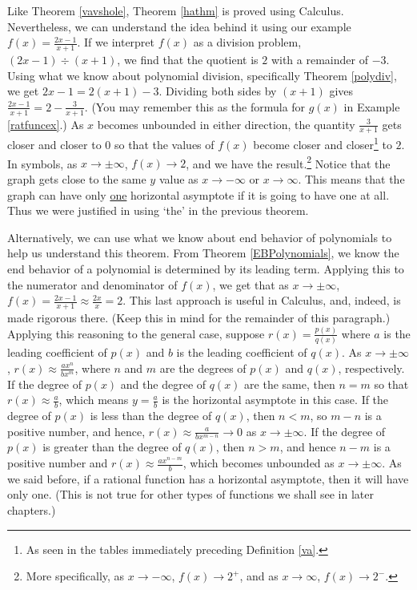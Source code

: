 Like Theorem \ref{vavshole}, Theorem \ref{hathm} is proved using Calculus.  Nevertheless, we can understand the idea behind it using our example $f(x) = \frac{2x-1}{x+1}$.  If we interpret $f(x)$ as a division problem, $(2x-1) \div (x+1)$, we find that the quotient is $2$ with a remainder of $-3$.  Using what we know about polynomial division, specifically Theorem \ref{polydiv}, we get $2x-1 = 2(x+1) -3$.  Dividing both sides by $(x+1)$ gives   $\frac{2x-1}{x+1} = 2 - \frac{3}{x+1}$.  (You may remember this as the formula for $g(x)$ in Example \ref{ratfuncex}.)  As $x$ becomes unbounded in either direction, the quantity $\frac{3}{x+1}$ gets closer and closer to $0$ so that the values of $f(x)$ become closer and closer\footnote{As seen in the tables immediately preceding Definition \ref{va}.} to $2$. In symbols, as $x \rightarrow \pm \infty$, $f(x) \rightarrow 2$, and we have the result.\footnote{More specifically, as $x \rightarrow -\infty$, $f(x) \rightarrow 2^{+}$, and as $x \rightarrow \infty$, $f(x) \rightarrow 2^{-}$.}  Notice that the graph gets close to the same $y$ value as $x \rightarrow -\infty$ or $x \rightarrow \infty$.  This means that the graph can have only \underline{one} horizontal asymptote if it is going to have one at all.  Thus we were justified in using `the' in the previous theorem.

\smallskip

Alternatively, we can use what we know about end behavior of polynomials to help us understand this theorem.  From Theorem \ref{EBPolynomials}, we know the end behavior of a polynomial is determined by its leading term.  Applying this to the numerator and denominator of $f(x)$, we get that as $x \rightarrow \pm \infty$, $f(x) = \frac{2x-1}{x+1} \approx \frac{2x}{x} = 2$.  This last approach is useful in Calculus, and, indeed, is made rigorous there.  (Keep this in mind for the remainder of this paragraph.)  Applying this reasoning to the general case, suppose $r(x) = \frac{p(x)}{q(x)}$ where $a$ is the leading coefficient of $p(x)$ and $b$ is the leading coefficient of $q(x)$. As $x \rightarrow \pm \infty$, $r(x) \approx \frac{ax^n}{bx^m}$, where $n$ and $m$ are the degrees of $p(x)$ and $q(x)$, respectively.  If the degree of $p(x)$ and the degree of $q(x)$ are the same, then $n=m$ so that $r(x) \approx \frac{a}{b}$, which means $y=\frac{a}{b}$ is the horizontal asymptote in this case.  If the degree of $p(x)$ is less than the degree of $q(x)$, then $n < m$, so $m-n$ is a positive number, and hence, $r(x) \approx \frac{a}{bx^{m-n}} \rightarrow 0$ as $x \rightarrow \pm \infty$.  If the degree of $p(x)$ is greater than the degree of $q(x)$, then $n > m$, and hence $n-m$ is a positive number and $r(x) \approx \frac{ax^{n-m}}{ b}$, which becomes unbounded as $x \rightarrow \pm \infty$.  As we said before, if a rational function has a horizontal asymptote, then it will have only one.  (This is not true for other types of functions we shall see in later chapters.)
 
